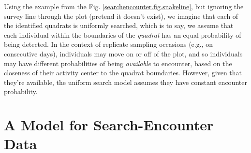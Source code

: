 Using the example from the Fig. \ref{searchencounter.fig.snakeline},
but ignoring the survey line through the plot (pretend it doesn't
exist), we imagine that each of the identified quadrats is uniformly
searched, which is to say, we assume that each individual within the
boundaries of the {\it quadrat} has an equal probability of being
detected.  In the context of replicate sampling occasions (e.g., on
consecutive days), individuals may move on or off of the plot, and so
individuals may have different probabilities of being {\it available}
to encounter, based on the closeness of their activity center to the
quadrat boundaries. However, given that they're available, the uniform
search model assumes they have constant encounter probability.

\section{A Model for Search-Encounter Data}


